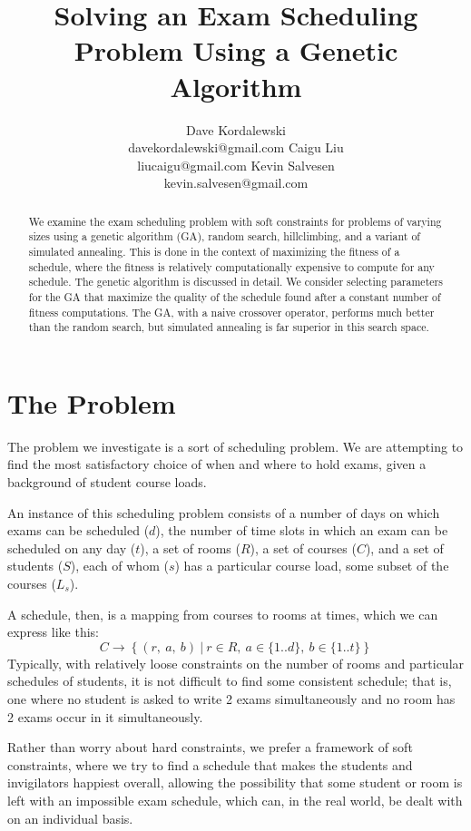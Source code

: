 \documentclass[letterpaper]{article}
\title{Solving an Exam Scheduling Problem Using a Genetic Algorithm}
\author{Dave Kordalewski \\ davekordalewski@gmail.com
   \And Caigu Liu \\liucaigu@gmail.com
   \And Kevin Salvesen \\ kevin.salvesen@gmail.com}
\begin{document}
\maketitle

\begin{abstract}
  We examine the exam scheduling problem with soft constraints for problems of varying
  sizes using a genetic algorithm (GA), random search, hillclimbing, and a variant of simulated
  annealing. This is done in the context of maximizing the fitness of a schedule, where the
  fitness is relatively computationally expensive to compute for any schedule. The genetic
  algorithm is discussed in detail. We consider selecting parameters for the GA that
  maximize the quality of the schedule found after a constant number of fitness computations. 
  The GA, with a naive crossover operator, performs much better than the random search, but
  simulated annealing is far superior in this search space.
\end{abstract}

\section{The Problem}
  The problem we investigate is a sort of scheduling problem. 
  We are attempting to find the most satisfactory choice of when
  and where to hold exams, given a background of student course loads. 

  An instance of this scheduling problem consists of a number of days
  on which exams can be scheduled ($d$), the number of time slots in which
  an exam can be scheduled on any day ($t$), a set of rooms ($R$), a set of
  courses ($C$), and a set of students ($S$), each of whom ($s$) has a
  particular course load, some subset of the courses ($L_s$).

  A schedule, then, is a mapping from courses to rooms at times, 
  which we can express like this:
  \[ C \rightarrow \left\{(r,\ a,\ b)\ |\ r\in R,\ a\in \{1..d\},\ b\in \{1..t\}\right\} \]
  Typically, with relatively loose constraints on the number of rooms and 
  particular schedules of students, it is not difficult to find some consistent
  schedule; that is, one where no student is asked to write 2 exams
  simultaneously and no room has 2 exams occur in it simultaneously.

  Rather than worry about hard constraints, we prefer a framework of soft 
  constraints, where we try to find a schedule that makes the students and 
  invigilators happiest overall, allowing the possibility that some student 
  or room is left with an impossible exam schedule, which can, in the real 
  world, be dealt with on an individual basis.
  
\end{document}
